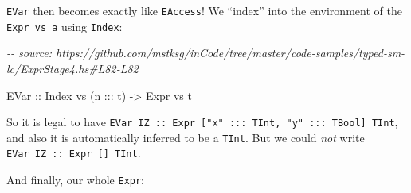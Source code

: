 \documentclass[]{article}
\newenvironment{Shaded}{}{}
\newcommand{\CommentTok}[1]{\textcolor[rgb]{0.38,0.63,0.69}{\textit{#1}}}
\newcommand{\DataTypeTok}[1]{\textcolor[rgb]{0.56,0.13,0.00}{#1}}
\newcommand{\NormalTok}[1]{#1}
\newcommand{\OperatorTok}[1]{\textcolor[rgb]{0.40,0.40,0.40}{#1}}
\newcommand{\OtherTok}[1]{\textcolor[rgb]{0.00,0.44,0.13}{#1}}
\begin{document}
\texttt{EVar} then becomes exactly like \texttt{EAccess}! We ``index'' into the
environment of the \texttt{Expr\ vs\ a} using \texttt{Index}:

\begin{Shaded}
\begin{Highlighting}[]
\CommentTok{{-}{-} source: https://github.com/mstksg/inCode/tree/master/code{-}samples/typed{-}sm{-}lc/ExprStage4.hs\#L82{-}L82}

  \DataTypeTok{EVar}\OtherTok{ ::} \DataTypeTok{Index}\NormalTok{ vs (n }\OperatorTok{:::}\NormalTok{ t) }\OtherTok{{-}\textgreater{}} \DataTypeTok{Expr}\NormalTok{ vs t}
\end{Highlighting}
\end{Shaded}

So it is legal to have
\texttt{EVar\ IZ\ ::\ Expr\ {[}"x"\ :::\ TInt,\ "y"\ :::\ TBool{]}\ TInt}, and
also it is automatically inferred to be a \texttt{TInt}. But we could \emph{not}
write \texttt{EVar\ IZ\ ::\ Expr\ {[}{]}\ TInt}.

And finally, our whole \texttt{Expr}:
\end{document}
